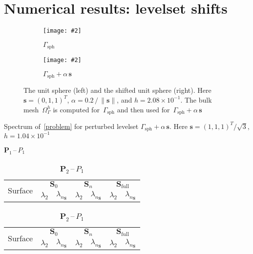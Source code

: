 \documentclass[12pt]{article}
\newcommand{\includegraphicsw}[2][1.]{\texttt{[image: \#2]}}
\newcommand{\vect}[1]{\boldsymbol{\mathbf{#1}}}
\newcommand{\sphere}{{\Gamma_{\text{sph}}}}
\begin{document}
\clearpage

\section{Numerical results: levelset shifts}

\begin{figure}[h]
	\centering
	\begin{subfigure}{.5\linewidth}
		\centering
		\includegraphicsw{{shift_0.0}.png}
		\caption{$\sphere$}
	\end{subfigure}%
	\begin{subfigure}{.5\linewidth}
		\centering
		\includegraphicsw{{shift_0.2}.png}
		\caption{$\sphere + \alpha\,\vect s$}
	\end{subfigure}%
	\caption{The unit sphere (left) and the shifted unit sphere (right). Here $\vect s = (0, 1, 1)^T$, $\alpha = 0.2\,/\,\|\vect s\|$, and $h = 2.08\times10^{-1}$. The bulk mesh~$\Omega_\Gamma^h$ is computed for~$\sphere$ and then used for~$\sphere + \alpha\,\vect s$}
	\label{fig:shift}		
\end{figure}

\begin{table}[h!]
	\centering
	\caption{Spectrum of~\eqref{problem} for perturbed levelset $\sphere + \alpha\,\vect s$. Here $\vect s = (1, 1, 1)^T/\sqrt{3}$, $h = 1.04\times10^{-1}$} 
	\label{tab:p1p1_shift_h=0.104167}
	\small
	\begin{subtable}{1.\linewidth}
		\centering
		\caption{$\vect P_1$\,--\,$P_1$}
		\begin{tabular}[1.3]{|c|c|c|c|c|c|c|}
			\hline
			\multirow{2}{*}{Surface} & \multicolumn{2}{c|}{$\vect S_0$} & \multicolumn{2}{c|}{$\vect S_n$} & \multicolumn{2}{c|}{$\vect S_{\text{full}}$} \\ 
			\cline{2-7}
			& $\lambda_2$ & $\lambda_{n_{\vect S}}$ & $\lambda_2$ & $\lambda_{n_{\vect S}}$ & $\lambda_2$ & $\lambda_{n_{\vect S}}$ \\ 
			\hline
			
		\end{tabular}
	\end{subtable}
	\vskip 4mm
	\begin{subtable}{1.\linewidth}
		\centering
		\caption{$\vect P_2$\,--\,$P_1$}
		\begin{tabular}[1.3]{|c|c|c|c|c|c|c|}
			\hline
			\multirow{2}{*}{Surface} & \multicolumn{2}{c|}{$\vect S_0$} & \multicolumn{2}{c|}{$\vect S_n$} & \multicolumn{2}{c|}{$\vect S_{\text{full}}$} \\ 
			\cline{2-7}
			& $\lambda_2$ & $\lambda_{n_{\vect S}}$ & $\lambda_2$ & $\lambda_{n_{\vect S}}$ & $\lambda_2$ & $\lambda_{n_{\vect S}}$ \\ 
			\hline
			
		\end{tabular}%
	\end{subtable}
\end{table}



\end{document}

